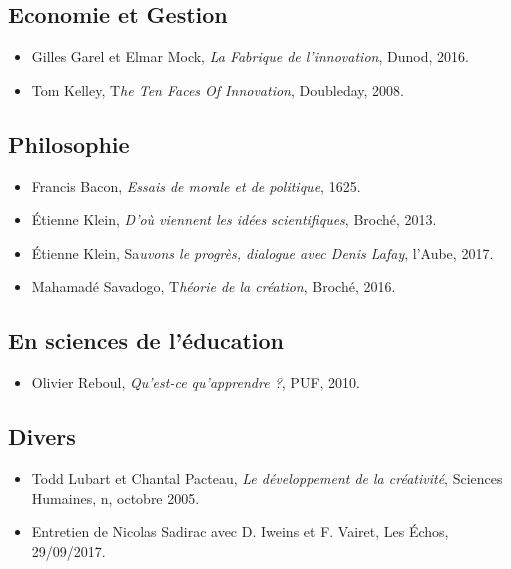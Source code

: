 \documentclass{article}
\begin{document}
\subsection{Economie et Gestion}

\begin{itemize}

\item Gilles Garel et Elmar Mock, \textit{La Fabrique de l'innovation}, Dunod, 2016.
\item Tom Kelley, T\textit{he Ten Faces Of Innovation}, Doubleday, 2008.

\end{itemize}

\subsection{Philosophie}

\begin{itemize}

\item Francis Bacon, \textit{Essais de morale et de politique}, 1625.
\item Étienne Klein, \textit{D'où viennent les idées scientifiques}, Broché, 2013.
\item Étienne Klein, Sa\textit{uvons le progrès, dialogue avec Denis Lafay}, l’Aube, 2017.
\item Mahamadé Savadogo, T\textit{héorie de la création}, Broché, 2016.	

\end{itemize}

\subsection{En sciences de l’éducation}

\begin{itemize}

\item Olivier Reboul, \textit{Qu'est-ce qu'apprendre ?}, PUF, 2010.

\end{itemize}

\subsection{Divers}

\begin{itemize}

\item Todd Lubart et Chantal Pacteau, \textit{Le développement de la créativité}, Sciences Humaines, n, octobre 2005.
\item Entretien de Nicolas Sadirac avec D. Iweins et F. Vairet, Les Échos, 29/09/2017.

\end{itemize}
\end{document}
